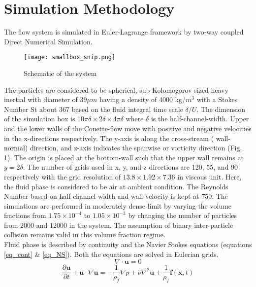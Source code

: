 \documentclass[aip,graphicx]{revtex4-1}
\begin{document}
  
  \section{Simulation Methodology}
 \label{sec:sim_meth}
   The flow system is simulated in Euler-Lagrange framework by two-way coupled Direct Numerical Simulation.  
  \begin{figure}[h]
  	\centering
  	\texttt{[image: smallbox\_snip.png]}
  	\caption{Schematic of the system}
  	\label{fig:schematic1}
  \end{figure}
   The particles are considered to be spherical, sub-Kolomogorov sized heavy inertial with diameter
  of $39\mu m$ having a density of 4000 kg/$m^3$ with a Stokes Number St about $367$ based on the fluid integral time scale $\delta/U$. The dimension of the simulation box is $10\pi\delta\times2\delta\times4\pi\delta$ where $\delta$ is the half-channel-width. Upper and the lower walls of the Couette-flow move with positive and negative velocities in the x-directions respectively. The  y-axis is along the cross-stream (
  \textcolor{black}{wall-normal}) direction, and z-axis indicates the spanwise or vorticity direction (Fig. \ref{fig:schematic1}). The origin is placed at the bottom-wall such that the upper wall remains at $y=2\delta$. The number of grids used in x, y, and z directions are 120, 55, and 90  respectively with the grid resolution of  $13.8\times1.92\times7.36$ in viscous \textcolor{black}{unit}. Here, the fluid phase is considered to be air at ambient condition. The Reynolds Number based on half-channel width and wall-velocity is kept at $750$. The simulations are performed in moderately dense limit by varying the volume fractions from $1.75\times10^{-4}$ to $1.05\times10^{-3}$ by changing the number of particles from $2000$ and $12000$ in the system. The assumption of binary inter-particle collision remains valid in this volume fraction regime.
  \\ Fluid phase is described by continuity  and the Navier Stokes equations (equations \ref{eq_cont} \& \ref{eq_NS}). Both the equations are solved in Eulerian grids.	
   \begin{equation} 
	\nabla\cdot\mathbf{u}=0
	\label{eq_cont}
	\end{equation}
	\begin{equation}
	\frac{\partial\mathbf{u}}{\partial t}+\mathbf{u}\cdot\nabla \mathbf{u}=-\frac{1}{\rho_{f}}\nabla p+ \nu \nabla^2 \mathbf{u} + \frac{1}{\rho_f}\mathbf{f}(\mathbf{x},t)
	\label{eq_NS}
	\end{equation}
\end{document}
